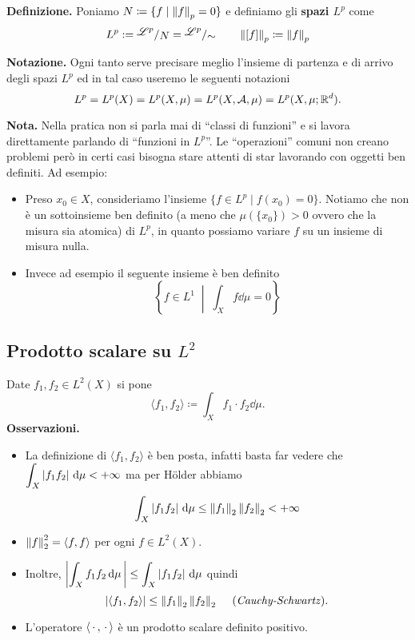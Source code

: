 \textbf{Definizione.}
Poniamo $N \coloneqq \{ f \mid \left\lVert f \right\rVert_p = 0 \}$ e definiamo gli \textbf{spazi $L^p$} come
$$
L^p := \sfrac{\mathscr L^p}{N} = \sfrac{\mathscr L^p}{\sim} 
\qquad
\norm{[f]}_p \coloneqq \norm{f}_p
$$

\textbf{Notazione.}
Ogni tanto serve precisare meglio l'insieme di partenza e di arrivo degli spazi $L^p$ ed in tal caso useremo le seguenti notazioni
$$
L^p = L^p(X) = L^p(X, \mu) = L^p(X, \mathcal{A}, \mu) = L^p(X, \mu; \mathbb R^d).
$$

\textbf{Nota.}
Nella pratica non si parla mai di ``classi di funzioni'' e si lavora direttamente parlando di ``funzioni in $L^p$''. Le ``operazioni'' comuni non creano problemi però in certi casi bisogna stare attenti di star lavorando con oggetti ben definiti. Ad esempio:
\begin{itemize}
	\item Preso $x_0 \in X$, consideriamo l'insieme $\{ f \in L^p \mid f(x_0) = 0 \}$. Notiamo che non è un sottoinsieme ben definito (a meno che $\mu(\{ x_0 \}) > 0$ ovvero che la misura sia atomica) di $L^p$, in quanto possiamo variare $f$ su un insieme di misura nulla.

	\item Invece ad esempio il seguente insieme è ben definito
		$$
		\left\{ f \in L^1 \;\middle|\; \int_X f \dd \mu = 0 \right\}
		$$
\end{itemize}

\subsection{Prodotto scalare su $L^2$}

Date $f_1,f_2 \in L^2(X)$ si pone
%
$$
\langle f_1, f_2 \rangle \coloneqq \int_{X}^{} f_1 \cdot f_2 \dd \mu.
$$
%
\textbf{Osservazioni.}

\begin{itemize}
\item La definizione di $\langle f_1, f_2 \rangle$ è ben posta, infatti basta far vedere che $\displaystyle \int_X \left| f_1 f_2 \right| \,\mathrm{d} \mu < +\infty$ ma per H\"older abbiamo
%
$$
\int_{X}^{} \left| f_1 f_2 \right| \,\mathrm{d} \mu \leq \left\lVert f_1 \right\rVert_2 \left\lVert f_2 \right\rVert_2 < +\infty
$$
%

\item $\left\lVert f \right\rVert_2^2 = \langle f,f \rangle$ per ogni $f \in L^2(X)$.

\item Inoltre, $\displaystyle \left| \int_X f_1 f_2 \,\mathrm{d} \mu \, \right| \leq \int_X \left| f_1 f_2 \right| \,\mathrm{d} \mu$ quindi
%
$$
\left| \langle f_1, f_2 \rangle \right| \leq \left\lVert f_1 \right\rVert_2 \left\lVert f_2 \right\rVert_2 \quad \; \text{(\textit{Cauchy-Schwartz})}.
$$

\item L'operatore $\langle \,\cdot\,, \,\cdot\, \rangle$ è un prodotto scalare definito positivo.

\end{itemize}

